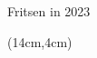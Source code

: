 \thispagestyle{empty}



\begingroup
    \fontsize{80pt}{82pt}\selectfont
    \begin{center}Fritsen in 2023\end{center}
\endgroup

\vspace{0.5cm}

\begin{textblock*}{5cm}(14cm,4cm) %
   \tweedeDruk
\end{textblock*}









